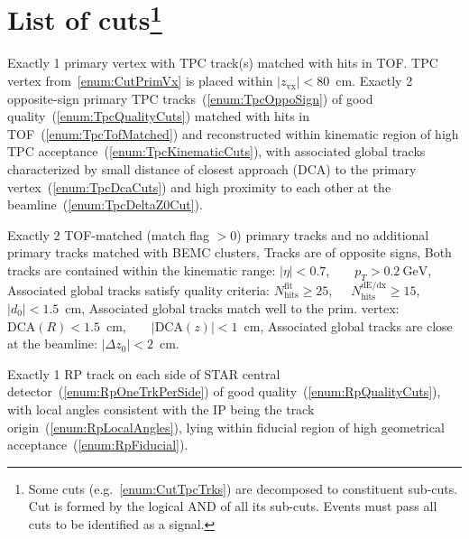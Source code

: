 \section[List of cuts]{List of cuts\footnote{Some cuts (e.g.~\ref{enum:CutTpcTrks}) are decomposed to constituent sub-cuts. Cut is formed by the logical AND of all its sub-cuts. Events must pass all cuts to be identified as a signal.}}\label{sec:listOfCuts}
\begin{enumerate}[label=\textbf{\hyperref[sec:C\arabic*]{C\arabic*}},ref=C\arabic*]
 \itemm Exactly 1 primary vertex with TPC track(s) matched with hits in TOF.\label{enum:CutPrimVx}
 \itemm TPC vertex from~\ref{enum:CutPrimVx} is placed within $|z_{\text{vx}}|<80$~cm.\label{enum:CutZVx}
 \itemm Exactly 2 opposite-sign primary TPC tracks~(\ref{enum:TpcOppoSign}) of good quality~(\ref{enum:TpcQualityCuts}) matched with hits in TOF~(\ref{enum:TpcTofMatched}) and reconstructed within kinematic region of high TPC acceptance~(\ref{enum:TpcKinematicCuts}), with associated global tracks characterized by small distance of closest approach (DCA) to the primary vertex~(\ref{enum:TpcDcaCuts}) and high proximity to each other at the beamline~(\ref{enum:TpcDeltaZ0Cut}).\label{enum:CutTpcTrks}
    \begin{enumerate}[label=\textbf{\theenumi.\arabic*},ref=\theenumi.\arabic*]
      \itemm Exactly 2 TOF-matched (match flag $>0$) primary tracks and no additional primary tracks matched with BEMC clusters,\label{enum:TpcTofMatched}
      \itemm Tracks are of opposite signs,\label{enum:TpcOppoSign}
      \itemm Both tracks are contained within the kinematic range:\label{enum:TpcKinematicCuts}\hspace*{13pt}
      $|\eta|<0.7$,~~~~$p_{T}>0.2~\text{GeV}$,
      \itemm Associated global tracks satisfy quality criteria:\label{enum:TpcQualityCuts}\hspace*{44pt}
      $N_{\text{hits}}^{\text{fit}}\geq25$,~~~$N_{\text{hits}}^{\text{dE/dx}}\geq15$,~~~$|d_{0}|<1.5$~cm,
      \itemm Associated global tracks match well to the prim. vertex:\label{enum:TpcDcaCuts}\hspace*{3.5pt}
      $\text{DCA}(R)<1.5$~cm,~~~~$|\text{DCA}(z)|<1$~cm,
      \itemm Associated global tracks are close at the beamline:\label{enum:TpcDeltaZ0Cut}\hspace*{29pt}
      $|\Delta z_{0}|<2$~cm.
    \end{enumerate}
 \itemm Exactly 1 RP track on each side of STAR central detector~(\ref{enum:RpOneTrkPerSide}) of good quality~(\ref{enum:RpQualityCuts}), with local angles consistent with the IP being the track origin~(\ref{enum:RpLocalAngles}), lying within fiducial region of high geometrical acceptance~(\ref{enum:RpFiducial}).\label{enum:CutRpTrks}

\end{enumerate}
